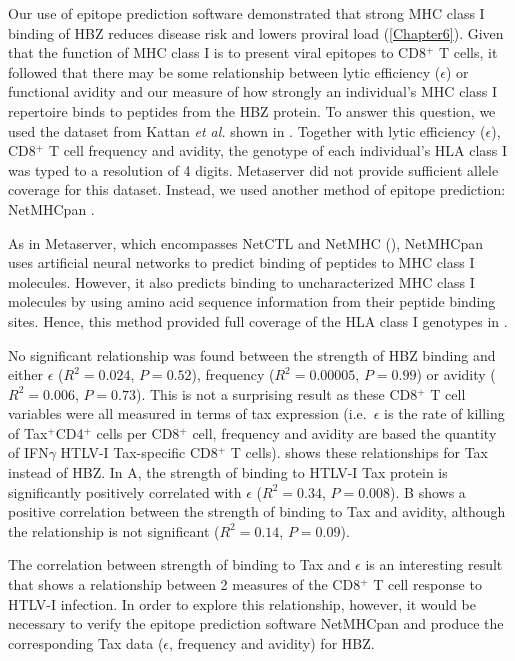 Our use of epitope prediction software demonstrated that strong MHC class I binding of HBZ reduces disease risk and lowers proviral load (\cref{Chapter6}). Given that the function of MHC class I is to present viral epitopes to CD8$^+$ T cells, it followed that there may be some relationship between lytic efficiency ($\epsilon$) or functional avidity and our measure of how strongly an individual's MHC class I repertoire binds to peptides from the HBZ protein. To answer this question, we used the dataset from Kattan \emph{et al.} \citep{Kattan2009} shown in . Together with lytic efficiency ($\epsilon$), CD8$^+$ T cell frequency and avidity, the genotype of each individual's HLA class I was typed to a resolution of 4 digits. Metaserver did not provide sufficient allele coverage for this dataset. Instead, we used another method of epitope prediction: NetMHCpan \citep{Nielsen2007}.

As in Metaserver, which encompasses NetCTL and NetMHC (), NetMHCpan uses artificial neural networks to predict binding of peptides to MHC class I molecules. However, it also predicts binding to uncharacterized MHC class I molecules by using amino acid sequence information from their peptide binding sites. Hence, this method provided full coverage of the HLA class I genotypes in .

No significant relationship was found between the strength of HBZ binding and either $\epsilon$ ($R^2 = 0.024$, $P = 0.52$), frequency ($R^2 = 0.00005$, $P = 0.99$) or avidity ($R^2 = 0.006$, $P = 0.73$). This is not a surprising result as these CD8$^+$ T cell variables were all measured in terms of tax expression (i.e.~$\epsilon$ is the rate of killing of Tax$^+$CD4$^+$ cells per CD8$^+$ cell, frequency and avidity are based the quantity of IFN$\gamma$ HTLV-I Tax-specific CD8$^+$ T cells).  shows these relationships for Tax instead of HBZ. In  A, the strength of binding to HTLV-I Tax protein is significantly positively correlated with $\epsilon$ ($R^2 = 0.34$, $P = 0.008$).  B shows a positive correlation between the strength of binding to Tax and avidity, although the relationship is not significant ($R^2 = 0.14$, $P = 0.09$).

The correlation between strength of binding to Tax and $\epsilon$ is an interesting result that shows a relationship between 2 measures of the CD8$^+$ T cell response to HTLV-I infection. In order to explore this relationship, however, it would be necessary to verify the epitope prediction software NetMHCpan and produce the corresponding Tax data ($\epsilon$, frequency and avidity) for HBZ. 

